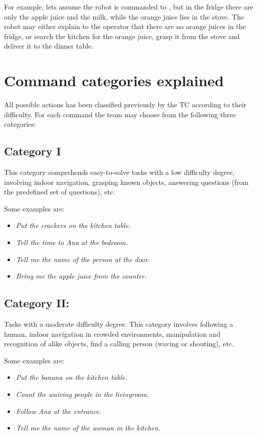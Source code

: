 For example, lets assume the robot is commanded to \textit{}, but in the fridge there are only the apple juice and the milk, while the orange juice lies in the stove. The robot may either explain to the operator that there are no orange juices in the fridge, or search the kitchen for the orange juice, grasp it from the stove and deliver it to the dinner table.

\section{Command categories explained}
All possible actions has been classified previously by the TC according to their difficulty. For each command the team may choose from the following three categories:

\subsection{Category I}
This category comprehends easy-to-solve tasks with a low difficulty degree, involving indoor navigation, grasping known objects, answering questions (from the predefined set of questions), etc.

Some examples are:
\begin{itemize}
	\item \textit{Put the crackers on the kitchen table.}
	\item \textit{Tell the time to Ana at the bedroom.}
	\item \textit{Tell me the name of the person at the door.}
	\item \textit{Bring me the apple juice from the counter.}
\end{itemize}

\subsection{Category II:}
Tasks with a moderate difficulty degree. This category involves following a human, indoor navigation in crowded environments, manipulation and recognition of alike objects, find a calling person (waving or shouting), etc. 

Some examples are:
\begin{itemize}
	\item \textit{Put the banana on the kitchen table.}
	\item \textit{Count the waiving people in the livingroom.}
	\item \textit{Follow Ana at the entrance.}
	\item \textit{Tell me the name of the woman in the kitchen.}
\end{itemize}



